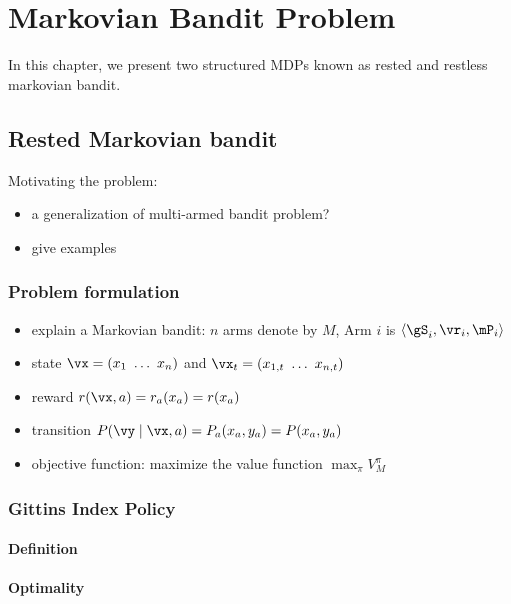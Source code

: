 \chapter{Markovian Bandit Problem}
\label{ch:mab_problem}

In this chapter, we present two structured MDPs known as rested and restless markovian bandit.

\section{Rested Markovian bandit}
\label{sec:rested_mab_pb}

Motivating the problem:
\begin{itemize}
    \item a generalization of multi-armed bandit problem?
    \item give examples
\end{itemize}

\subsection{Problem formulation}
\label{subsec:rested_pb_formul}

\begin{itemize}
    \item explain a Markovian bandit: $n$ arms denote by $M$, Arm $i$ is $\langle\gS_i, \vr_i,\mP_i\rangle$
    \item state $\vx=(x_1\ \dots\ x_n)$ and $\vx_t=(x_{1,t}\ \dots\ x_{n,t})$
    \item reward $r(\vx, a)=r_a(x_a)=r(x_a)$
    \item transition $P(\vy \mid\vx,a)=P_a(x_a,y_a)=P(x_a,y_a)$
    \item objective function: maximize the value function $\max_{\pi}V^\pi_M$ 
\end{itemize}

\subsection{Gittins Index Policy}
\label{subsec:gittins_idx}

\subsubsection{Definition}

\subsubsection{Optimality}

